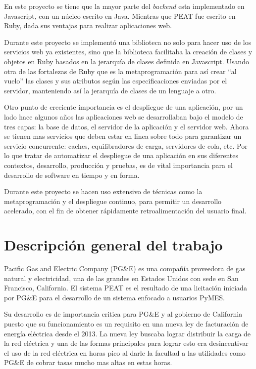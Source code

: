 \documentclass{article}
\begin{document}
En este proyecto se tiene que la mayor parte del \textit{backend} esta implementado
en Javascript, con un núcleo escrito en Java. Mientras que PEAT fue escrito
en Ruby, dada sus ventajas para realizar aplicaciones web.

Durante este proyecto se implementó una biblioteca no solo para hacer uso de
los servicios web ya existentes, sino que la biblioteca facilitaba la creación
de clases y objetos en Ruby basados en la jerarquía de clases definida
en Javascript. Usando otra de las fortalezas de Ruby que es la metaprogramación
para así crear ``al vuelo'' las clases y sus atributos según las especificaciones
enviadas por el servidor, manteniendo así la jerarquía de clases de un lenguaje
a otro.

Otro punto de creciente importancia es el despliegue de una aplicación, por un
lado hace algunos años las aplicaciones web se desarrollaban bajo el modelo de
tres capas: la base de datos, el servidor de la aplicación y el servidor web.
Ahora se tienen mas servicios
que deben estar en linea sobre todo para garantizar un servicio concurrente:
caches, equilibradores de carga, servidores de cola, etc. Por lo que tratar
de automatizar el despliegue de una aplicación en sus diferentes contextos,
desarrollo, producción y pruebas, es de vital importancia para el desarrollo
de software en tiempo y en forma.

Durante este proyecto se hacen uso extensivo de técnicas como la metaprogramación
y el despliegue continuo, para permitir un desarrollo acelerado, con el fin de
obtener rápidamente retroalimentación del usuario final.

\section{Descripción general del trabajo}
Pacific Gas and Electric Company (PG\&E) es una compañía proveedora de gas natural
y electricidad, una de las grandes en Estados Unidos con sede en
San Francisco, California. El sistema PEAT es el resultado de una licitación
iniciada por PG\&E para el desarrollo de un sistema enfocado a usuarios PyMES.

Su desarrollo es de importancia critica para PG\&E y al gobierno de
California puesto que su funcionamiento es un requisito en una nueva
ley de facturación de energía eléctrica desde el 2013. La nueva ley buscaba
lograr distribuir la carga de la red eléctrica y una de las formas
principales para lograr esto era desincentivar el uso de la red
eléctrica en horas pico al darle la facultad a las utilidades como PG\&E
de cobrar tasas mucho mas altas en estas horas.
\end{document}
